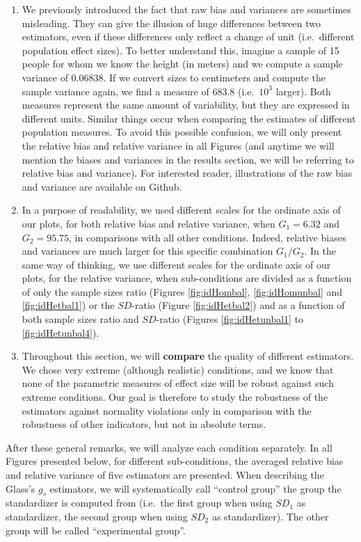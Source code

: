 \documentclass[
  man,floatsintext]{apa6}
\begin{document}
\begin{enumerate}
\def\labelenumi{\arabic{enumi})}
\item
  We previously introduced the fact that raw bias and variances are sometimes misleading. They can give the illusion of huge differences between two estimators, even if these differences only reflect a change of unit (i.e.~different population effect sizes). To better understand this, imagine a sample of 15 people for whom we know the height (in meters) and we compute a sample variance of 0.06838. If we convert sizes to centimeters and compute the sample variance again, we find a measure of 683.8 (i.e.~\(10^3\) larger). Both measures represent the same amount of variability, but they are expressed in different units. Similar things occur when comparing the estimates of different population measures. To avoid this possible confusion, we will only present the relative bias and relative variance in all Figures (and anytime we will mention the biases and variances in the results section, we will be referring to relative bias and variance). For interested reader, illustrations of the raw bias and variance are available on Github.
\item
  In a purpose of readability, we used different scales for the ordinate axis of our plots, for both relative bias and relative variance, when \(G_1 = 6.32\) and \(G_2 = 95.75\), in comparisons with all other conditions. Indeed, relative biases and variances are much larger for this specific combination \(G_1/G_2\). In the same way of thinking, we use different scales for the ordinate axis of our plots, for the relative variance, when sub-conditions are divided as a function of only the sample sizes ratio (Figures \ref{fig:idHombal}, \ref{fig:idHomunbal} and \ref{fig:idHetbal1}) or the \(SD\)-ratio (Figure \ref{fig:idHetbal2}) and as a function of both sample sizes ratio and \(SD\)-ratio (Figures \ref{fig:idHetunbal1} to \ref{fig:idHetunbal4}).
\item
  Throughout this section, we will \textbf{compare} the quality of different estimators. We chose very extreme (although realistic) conditions, and we know that none of the parametric measures of effect size will be robust against such extreme conditions. Our goal is therefore to study the robustness of the estimators against normality violations only in comparison with the robustness of other indicators, but not in absolute terms.
\end{enumerate}

After these general remarks, we will analyze each condition separately. In all Figures presented below, for different sub-conditions, the averaged relative bias and relative variance of five estimators are presented. When describing the Glass's \(g_s\) estimators, we will systematically call \enquote{control group} the group the standardizer is computed from (i.e.~the first group when using \(SD_1\) as standardizer, the second group when using \(SD_2\) as standardizer). The other group will be called \enquote{experimental group}.
\end{document}
